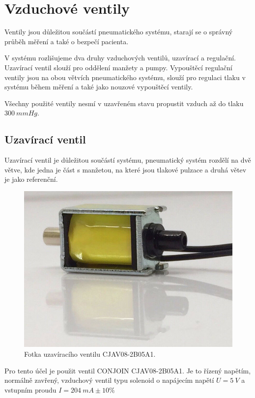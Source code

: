 \section{Vzduchové ventily}
Ventily jsou důležitou součástí pneumatického systému, starají se o správný průběh měření a také o bezpečí pacienta. \par
V systému rozlišujeme dva druhy vzduchových ventilů, uzavírací a regulační. Uzavírací ventil slouží pro oddělení manžety a pumpy. Vypouštěcí regulační ventily jsou na obou větvích pneumatického systému, slouží pro regulaci tlaku v systému během měření a také jako nouzové vypouštěcí ventily. \par
Všechny použité ventily nesmí v uzavřeném stavu propustit vzduch až do tlaku $300 \ mmHg$.
\pagebreak
\subsection{Uzavírací ventil}
Uzavírací ventil je důležitou součástí systému, pneumatický systém rozdělí na dvě větve, kde jedna je část s manžetou, na které jsou tlakové pulzace a druhá větev je jako referenční. \par

\begin{figure}[H]
    \includegraphics[width=0.9\linewidth]{pictures/closing_valve.jpg}
    \caption{Fotka uzavíracího ventilu CJAV08-2B05A1. \cite{cite:UzaviraciVentil}}
    \label{fig:closing_valve}
\end{figure}

Pro tento účel je použit ventil CONJOIN CJAV08-2B05A1. Je to řízený napětím, normálně zavřený, vzduchový ventil typu solenoid o napájecím napětí $U = 5 \ V$ a vstupním proudu $I = 204 \ mA \pm 10\% $

